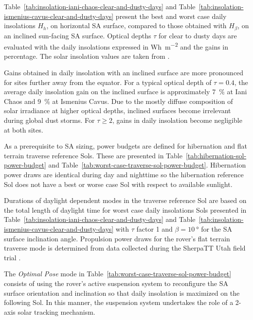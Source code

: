 \documentclass[twocolumn,letterpaper]{IEEEAerospaceCLS}  %
\newcommand{\refTab}[1]{{Table}~\ref{#1}}  %
\begin{document}


\refTab{tab:insolation-iani-chaos-clear-and-dusty-days} and \refTab{tab:insolation-ismenius-cavus-clear-and-dusty-days} present the best and worst case daily insolations $H_{h}$, on horizontal \ac{SA} surface, compared to those obtained with $H_{\beta}$, on an inclined sun-facing \ac{SA} surface. Optical depths $\tau$ for clear to dusty days are evaluated with the daily insolations expressed in \si{Wh.m^{-2}} and the gains in percentage. The solar insolation values are taken from \cite{Labreche2020}.



Gains obtained in daily insolation with an inclined surface are more pronounced for sites further away from the equator. For a typical optical depth of $\tau = 0.4$, the average daily insolation gain on the inclined surface is approximately \SI{7}{\percent} at Iani Chaos and \SI{9}{\percent} at Ismenius Cavus.
Due to the mostly diffuse composition of solar irradiance at higher optical depths, inclined surfaces become irrelevant during global dust storms. For $\tau \geq 2$, gains in daily insolation become negligible at both sites.

As a prerequisite to \ac{SA} sizing, power budgets are defined for hibernation and flat terrain traverse reference Sols. These are presented in \refTab{tab:hibernation-sol-power-budget} and \refTab{tab:worst-case-traverse-sol-power-budget}. Hibernation power draws are identical during day and nighttime so the hibernation reference Sol does not have a best or worse case Sol with respect to available sunlight.



Durations of daylight dependent modes in the traverse reference Sol are based on the total length of daylight time for worst case daily insolations Sols presented in \refTab{tab:insolation-iani-chaos-clear-and-dusty-days} and \refTab{tab:insolation-ismenius-cavus-clear-and-dusty-days} with $\tau$ factor 1 and $\beta=\SI{10}{\degree}$ for the \ac{SA} surface inclination angle. Propulsion power draws for the rover's flat terrain traverse mode is determined from data collected during the SherpaTT Utah field trial \cite{Cordes2018b}.



The \textit{Optimal Pose} mode in \refTab{tab:worst-case-traverse-sol-power-budget} consists of using the rover's active suspension system to reconfigure the \ac{SA} surface orientation and inclination so that daily insolation is maximized on the following Sol. In this manner, the suspension system undertakes the role of a 2-axis solar tracking mechanism.
\end{document}
